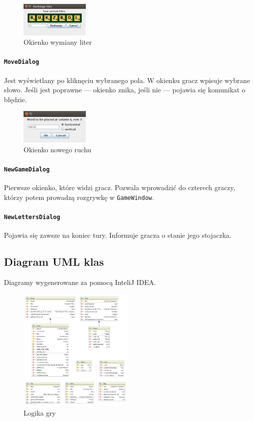 \documentclass[a4paper]{article}
\begin{document}
\begin{figure}[!ht]
\centering
\includegraphics[width=0.3\textwidth]{2.png}
\caption{Okienko wymiany liter}
\end{figure}

\paragraph{\texttt{MoveDialog}} Jest wyświetlany po kliknęciu wybranego pola. W okienku gracz wpisuje wybrane słowo.
Jeśli jest poprawne --- okienko znika, jeśli nie --- pojawia się komunikat o błędzie.

\begin{figure}[!ht]
\centering
\includegraphics[width=0.3\textwidth]{4.png}
\caption{Okienko nowego ruchu}
\end{figure}

\paragraph{\texttt{NewGameDialog}} Pierwsze okienko, które widzi gracz.
Pozwala wprowadzić do czterech graczy, którzy potem prowadzą rozgrywkę w \texttt{GameWindow}.
\paragraph{\texttt{NewLettersDialog}} Pojawia się zawsze na koniec tury. Informuje gracza o stanie jego stojaczka.

\newpage
\subsection{Diagram UML klas}
Diagramy wygenerowane za pomocą InteliJ IDEA.

\begin{figure}[ht]
\centering
\includegraphics[width=0.5\textwidth]{logika.png}
\caption{Logika gry}
\end{figure}
\end{document}
